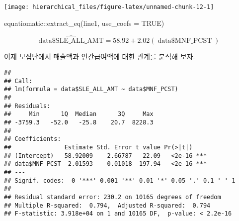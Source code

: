 \documentclass[
]{book}
\newenvironment{Shaded}{\begin{snugshade}}{\end{snugshade}}
\newcommand{\AttributeTok}[1]{\textcolor[rgb]{0.77,0.63,0.00}{#1}}
\newcommand{\ConstantTok}[1]{\textcolor[rgb]{0.00,0.00,0.00}{#1}}
\newcommand{\FunctionTok}[1]{\textcolor[rgb]{0.00,0.00,0.00}{#1}}
\newcommand{\NormalTok}[1]{#1}
\newcommand{\OtherTok}[1]{\textcolor[rgb]{0.56,0.35,0.01}{#1}}
\newcommand{\SpecialCharTok}[1]{\textcolor[rgb]{0.00,0.00,0.00}{#1}}
\newcommand{\StringTok}[1]{\textcolor[rgb]{0.31,0.60,0.02}{#1}}
\begin{document}
\texttt{[image: hierarchical\_files/figure-latex/unnamed-chunk-12-1]}

\begin{Shaded}
\begin{Highlighting}[]
\NormalTok{equatiomatic}\SpecialCharTok{::}\FunctionTok{extract\_eq}\NormalTok{(line1, }\AttributeTok{use\_coefs =} \ConstantTok{TRUE}\NormalTok{)}
\end{Highlighting}
\end{Shaded}

\[
\operatorname{\widehat{data\$SLE\_ALL\_AMT}} = 58.92 + 2.02(\operatorname{data\$MNF\_PCST})
\]

이제 모집단에서 매출액과 연간급여액에 대한 관계를 분석해 보자.

\begin{Shaded}
\end{Shaded}

\begin{verbatim}
## 
## Call:
## lm(formula = data$SLE_ALL_AMT ~ data$MNF_PCST)
## 
## Residuals:
##     Min      1Q  Median      3Q     Max 
## -3759.3   -52.0   -25.8    20.7  8228.3 
## 
## Coefficients:
##               Estimate Std. Error t value Pr(>|t|)    
## (Intercept)   58.92009    2.66787   22.09   <2e-16 ***
## data$MNF_PCST  2.01593    0.01018  197.94   <2e-16 ***
## ---
## Signif. codes:  0 '***' 0.001 '**' 0.01 '*' 0.05 '.' 0.1 ' ' 1
## 
## Residual standard error: 230.2 on 10165 degrees of freedom
## Multiple R-squared:  0.794,  Adjusted R-squared:  0.794 
## F-statistic: 3.918e+04 on 1 and 10165 DF,  p-value: < 2.2e-16
\end{verbatim}

\begin{Shaded}
\end{Shaded}
\end{document}
